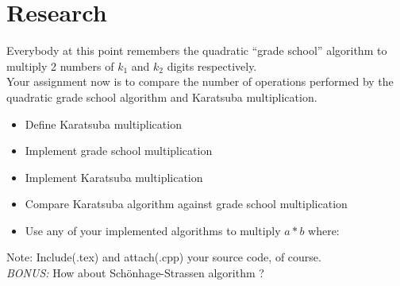 \section{Research}

Everybody at this point remembers the quadratic ``grade school'' algorithm to multiply 2 numbers of $k_{1}$ and $k_{2}$ digits respectively. \\

Your assignment now is to compare the number of operations performed by the quadratic grade school algorithm and Karatsuba multiplication.

\begin{itemize}
    \item Define Karatsuba multiplication
    \item Implement grade school multiplication
    \item Implement Karatsuba multiplication
    \item Compare Karatsuba algorithm against grade school multiplication
    \item Use any of your implemented algorithms to multiply $a*b$ where:
\end{itemize}

Note: Include(.tex) and attach(.cpp) your source code, of course.\\

\emph{BONUS:} How about Sch\"{o}nhage-Strassen algorithm ? 



